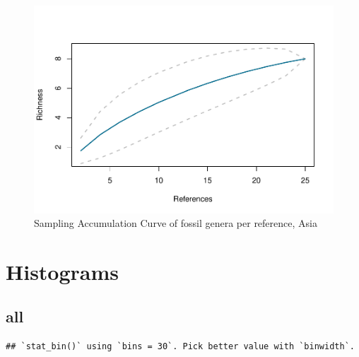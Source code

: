\documentclass[]{article}
\begin{document}
\begin{figure}[htbp]
\centering
\includegraphics{MA_JJ_files/figure-latex/SACGAsia-1.pdf}
\caption{Sampling Accumulation Curve of fossil genera per reference,
Asia}
\end{figure}

\newpage

\section{Histograms}\label{histograms}

\subsection{all}\label{all}

\begin{verbatim}
## `stat_bin()` using `bins = 30`. Pick better value with `binwidth`.
\end{verbatim}
\end{document}
